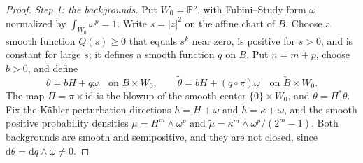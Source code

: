\begin{proof}
\emph{Step 1: the backgrounds.} Put $W_0=\mathbb P^p$, with Fubini--Study form $\omega$ normalized by $\int_{W_0}\omega^p=1$. Write $s=|z|^2$ on the affine chart of $B$. Choose a smooth function $Q(s)\geq0$ that equals $s^k$ near zero, is positive for $s>0$, and is constant for large $s$; it defines a smooth function $q$ on $B$. Put $n=m+p$, choose $b>0$, and define
\[
 \theta=bH+q\omega\quad\text{on }B\times W_0,\qquad
 \widetilde\theta=bH+(q\circ\pi)\omega
 \quad\text{on }\widetilde B\times W_0.
\]
The map $\Pi=\pi\times\mathrm{id}$ is the blowup of the smooth center $\{0\}\times W_0$, and $\widetilde\theta=\Pi^*\theta$. Fix the K\"ahler perturbation directions $h=H+\omega$ and $\widetilde h=\kappa+\omega$, and the smooth positive probability densities $\mu=H^m\wedge\omega^p$ and $\widetilde\mu=\kappa^m\wedge\omega^p/(2^m-1)$. Both backgrounds are smooth and semipositive, and they are not closed, since $\mathrm d\theta=\mathrm dq\wedge\omega\neq0$.


\end{proof}
